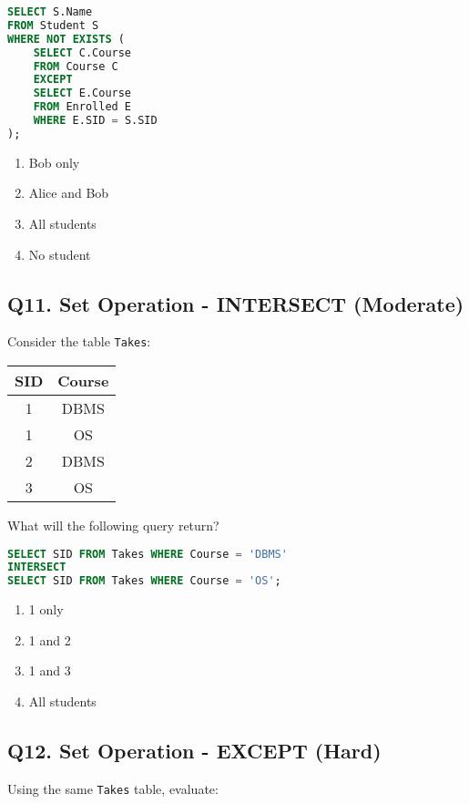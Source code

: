 \begin{lstlisting}[language=SQL]
SELECT S.Name
FROM Student S
WHERE NOT EXISTS (
    SELECT C.Course
    FROM Course C
    EXCEPT
    SELECT E.Course
    FROM Enrolled E
    WHERE E.SID = S.SID
);
\end{lstlisting}

\begin{enumerate}[label=(\alph*)]
    \item Bob only
    \item Alice and Bob
    \item All students
    \item No student
\end{enumerate}

\subsection*{Q11. Set Operation - INTERSECT (Moderate)}
Consider the table \texttt{Takes}:

\begin{tabular}{|c|c|}
\hline
\textbf{SID} & \textbf{Course} \\
\hline
1 & DBMS \\
1 & OS \\
2 & DBMS \\
3 & OS \\
\hline
\end{tabular}

What will the following query return?

\begin{lstlisting}[language=SQL]
SELECT SID FROM Takes WHERE Course = 'DBMS'
INTERSECT
SELECT SID FROM Takes WHERE Course = 'OS';
\end{lstlisting}

\begin{enumerate}[label=(\alph*)]
    \item 1 only
    \item 1 and 2
    \item 1 and 3
    \item All students
\end{enumerate}

\subsection*{Q12. Set Operation - EXCEPT (Hard)}
Using the same \texttt{Takes} table, evaluate:

